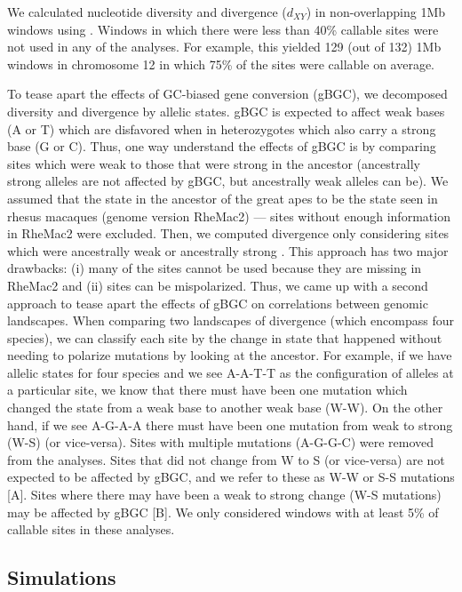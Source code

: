 We calculated nucleotide diversity and divergence ($d_{XY}$) in non-overlapping 1Mb windows using \allel \citep{miles_cgghscikit-allel_2020}.
Windows in which there were less than 40\% callable sites were not used in any of the analyses.
For example, this yielded 129 (out of 132) 1Mb windows in chromosome 12 in which 75\% of the sites were callable on average.

To tease apart the effects of GC-biased gene conversion (gBGC),
we decomposed diversity and divergence by allelic states.
gBGC is expected to affect weak bases (A or T) which are disfavored when in heterozygotes which also carry a strong base (G or C).
Thus, one way understand the effects of gBGC is by comparing sites which were weak to those that were strong in the ancestor (ancestrally strong alleles are not affected by gBGC, but ancestrally weak alleles can be).
We assumed that the state in the ancestor of the great apes to be the state seen in rhesus macaques (genome version RheMac2) --- sites without enough information in RheMac2 were excluded.
Then, we computed divergence only considering sites which were ancestrally weak or ancestrally strong .
This approach has two major drawbacks: (i) many of the sites cannot be used because they are missing in RheMac2 and (ii) sites can be mispolarized.
Thus, we came up with a second approach to tease apart the effects of gBGC on correlations between genomic landscapes.
When comparing two landscapes of divergence (which encompass four species),
we can classify each site by the change in state that happened without needing to polarize mutations by looking at the ancestor.
For example, if we have allelic states for four species and we see A-A-T-T as the configuration of alleles at a particular site,
we know that there must have been one mutation which changed the state from a weak base to another weak base (W-W).
On the other hand, if we see A-G-A-A there must have been one mutation from weak to strong (W-S) (or vice-versa).
Sites with multiple mutations (\eg A-G-G-C) were removed from the analyses.
Sites that did not change from W to S (or vice-versa) are not expected to be affected by gBGC,
and we refer to these as W-W or S-S mutations [A].
Sites where there may have been a weak to strong change (W-S mutations) may be affected by gBGC [B].
We only considered windows with at least 5\% of callable sites in these analyses.


\subsection{Simulations}\label{sec:methods:simu}

